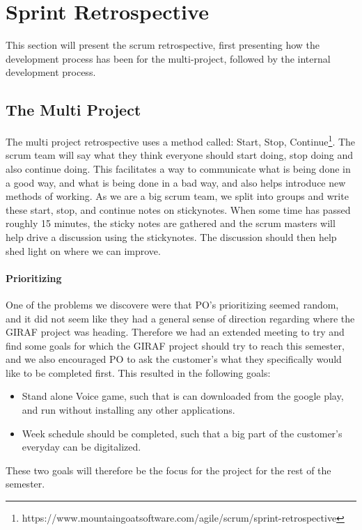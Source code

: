 \section{Sprint Retrospective}

This section will present the scrum retrospective, first presenting how the development process has been for the multi-project, followed by the internal development process.

\subsection*{The Multi Project}

The multi project retrospective uses a method called: Start, Stop, Continue\footnote{https://www.mountaingoatsoftware.com/agile/scrum/sprint-retrospective}.
The scrum team will say what they think everyone should start doing, stop doing and also continue doing. 
This facilitates a way to communicate what is being done in a good way, and what is being done in a bad way, and also helps introduce new methods of working.
As we are a big scrum team, we split into groups and write these start, stop, and continue notes on stickynotes.
When some time has passed roughly 15 minutes, the sticky notes are gathered and the scrum masters will help drive a discussion using the stickynotes.
The discussion should then help shed light on where we can improve.

\paragraph{Prioritizing} One of the problems we discovere were that PO's prioritizing seemed random, and it did not seem like they had a general sense of direction regarding where the GIRAF project was heading.
Therefore we had an extended meeting to try and find some goals for which the GIRAF project should try to reach this semester, and we also encouraged PO to ask the customer's what they specifically would like to be completed first.
This resulted in the following goals:
\begin{itemize}
	\item Stand alone Voice game, such that is can downloaded from the google play, and run without installing any other applications.
	\item Week schedule should be completed, such that a big part of the customer's everyday can be digitalized.
\end{itemize}
These two goals will therefore be the focus for the project for the rest of the semester.

